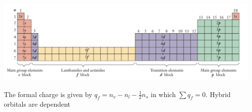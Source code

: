 \documentclass{tufte-book}
\begin{document}
\begin{fullwidth}
  \begin{center}
    \includegraphics[width=1.5\textwidth]{table}
  \end{center}
\end{fullwidth}

The formal charge is given by $q_f = n_v - n_l - \frac{1}{2} n_s$ in which $\sum q_f = 0$. Hybrid orbitals are dependent 
\end{document}
